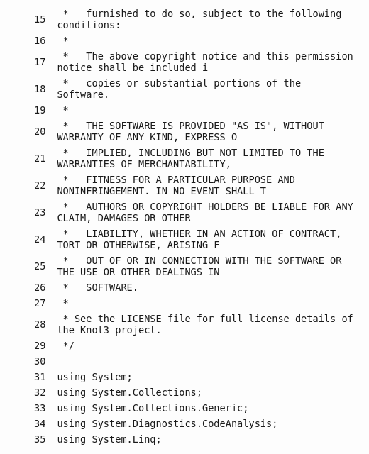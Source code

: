 \documentclass[a4paper,10pt]{article}
\begin{document}
\begin{longtable}[l]{lrrl}
\cellcolor{gray} &  & \verb~15~ & \verb~ *   furnished to do so, subject to the following conditions:~\\
\cellcolor{gray} &  & \verb~16~ & \verb~ *~\\
\cellcolor{gray} &  & \verb~17~ & \verb~ *   The above copyright notice and this permission notice shall be included i~\\
\cellcolor{gray} &  & \verb~18~ & \verb~ *   copies or substantial portions of the Software.~\\
\cellcolor{gray} &  & \verb~19~ & \verb~ *~\\
\cellcolor{gray} &  & \verb~20~ & \verb~ *   THE SOFTWARE IS PROVIDED "AS IS", WITHOUT WARRANTY OF ANY KIND, EXPRESS O~\\
\cellcolor{gray} &  & \verb~21~ & \verb~ *   IMPLIED, INCLUDING BUT NOT LIMITED TO THE WARRANTIES OF MERCHANTABILITY,~\\
\cellcolor{gray} &  & \verb~22~ & \verb~ *   FITNESS FOR A PARTICULAR PURPOSE AND NONINFRINGEMENT. IN NO EVENT SHALL T~\\
\cellcolor{gray} &  & \verb~23~ & \verb~ *   AUTHORS OR COPYRIGHT HOLDERS BE LIABLE FOR ANY CLAIM, DAMAGES OR OTHER~\\
\cellcolor{gray} &  & \verb~24~ & \verb~ *   LIABILITY, WHETHER IN AN ACTION OF CONTRACT, TORT OR OTHERWISE, ARISING F~\\
\cellcolor{gray} &  & \verb~25~ & \verb~ *   OUT OF OR IN CONNECTION WITH THE SOFTWARE OR THE USE OR OTHER DEALINGS IN~\\
\cellcolor{gray} &  & \verb~26~ & \verb~ *   SOFTWARE.~\\
\cellcolor{gray} &  & \verb~27~ & \verb~ *~\\
\cellcolor{gray} &  & \verb~28~ & \verb~ * See the LICENSE file for full license details of the Knot3 project.~\\
\cellcolor{gray} &  & \verb~29~ & \verb~ */~\\
\cellcolor{gray} &  & \verb~30~ & \verb~~\\
\cellcolor{gray} &  & \verb~31~ & \verb~using System;~\\
\cellcolor{gray} &  & \verb~32~ & \verb~using System.Collections;~\\
\cellcolor{gray} &  & \verb~33~ & \verb~using System.Collections.Generic;~\\
\cellcolor{gray} &  & \verb~34~ & \verb~using System.Diagnostics.CodeAnalysis;~\\
\cellcolor{gray} &  & \verb~35~ & \verb~using System.Linq;~\\

\end{longtable}
\end{document}
